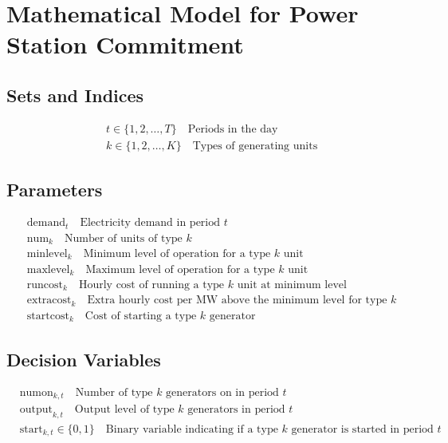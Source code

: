 \documentclass{article}
\begin{document}
\section*{Mathematical Model for Power Station Commitment}

\subsection*{Sets and Indices}
\begin{align*}
    & t \in \{1, 2, \ldots, T\} \quad \text{Periods in the day} \\
    & k \in \{1, 2, \ldots, K\} \quad \text{Types of generating units}
\end{align*}

\subsection*{Parameters}
\begin{align*}
    & \text{demand}_{t} \quad \text{Electricity demand in period } t \\
    & \text{num}_{k} \quad \text{Number of units of type } k \\
    & \text{minlevel}_{k} \quad \text{Minimum level of operation for a type } k \text{ unit} \\
    & \text{maxlevel}_{k} \quad \text{Maximum level of operation for a type } k \text{ unit} \\
    & \text{runcost}_{k} \quad \text{Hourly cost of running a type } k \text{ unit at minimum level} \\
    & \text{extracost}_{k} \quad \text{Extra hourly cost per MW above the minimum level for type } k \\
    & \text{startcost}_{k} \quad \text{Cost of starting a type } k \text{ generator}
\end{align*}

\subsection*{Decision Variables}
\begin{align*}
    & \text{numon}_{k,t} \quad \text{Number of type } k \text{ generators on in period } t\\
    & \text{output}_{k,t} \quad \text{Output level of type } k \text{ generators in period } t\\
    & \text{start}_{k,t} \in \{0,1\} \quad \text{Binary variable indicating if a type } k \text{ generator is started in period } t
\end{align*}
\end{document}
